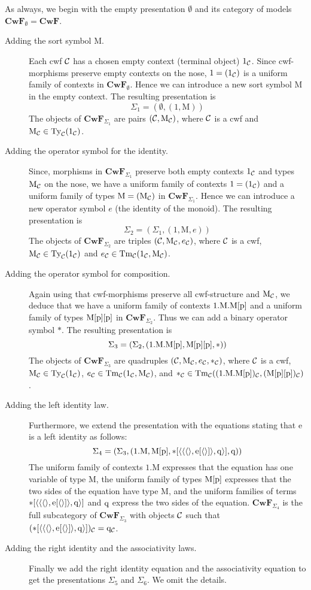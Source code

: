 \documentclass{mscs}
\newcommand{\FYI}[1]{{#1}}
\def\Cwf{\mathbf{CwF}}
\def\Mon{\mathrm{M}}
\def\idmon{\mathrm{e}}
\def\comp{\mathrm{*}}
\begin{document}
As always, we begin with the empty \FYI{presentation} $\emptyset$ and its category of models $\Cwf_\emptyset = \Cwf$.
\begin{description}
\item[Adding the sort symbol $\Mon$.] Each cwf ${\mathcal C}$ has a chosen empty context (terminal object) $1_{\mathcal C}$. Since cwf-morphisms preserve empty contexts on the nose, $1 = (1_{\mathcal C})$ is a uniform family of contexts in $\Cwf_\emptyset$. Hence we can introduce a new sort symbol $\Mon$ in the empty context. The resulting \FYI{presentation} is
$$
\Sigma_1 = (\emptyset, (1,\Mon))
$$
The objects of $\Cwf_{\Sigma_1}$  are pairs $(\C,\Mon_\C)$, where ${\mathcal C}$ is a cwf and $\Mon_\C \in \Ty_\C(1_\C)$.
\item[Adding the operator symbol for the identity.]
Since, morphisms in $\Cwf_{\Sigma_1}$ preserve both empty contexts $1_{\mathcal C}$ and types $\Mon_\C$ on the nose, we have a uniform family of contexts $1 = (1_{\mathcal C})$ and a uniform family of types $\Mon = (\Mon_\C)$ in $\Cwf_{\Sigma_1}$. Hence we can introduce a new operator symbol $e$ (the identity of the monoid).  The resulting \FYI{presentation} is
$$
\Sigma_2 = (\Sigma_1, (1,\Mon,e))
$$
The objects of $\Cwf_{\Sigma_2}$  are triples $(\C,\Mon_\C,e_\C)$, where ${\mathcal C}$ is a cwf, $\Mon_\C \in \Ty_\C(1_\C)$ and $e_\C \in \Tm_\C(1_\C,\Mon_\C)$.
\item[Adding the operator symbol for composition.]
Again using that cwf-morphisms preserve all cwf-structure and $\Mon_\C$, we deduce that we have a uniform family of contexts $1.\Mon.\Mon[\p]$ and a uniform family of types $\Mon[\p][\p]$ in $\Cwf_{\Sigma_2}$. Thus we can add a binary operator symbol $\comp$. The resulting \FYI{presentation} is
$$
\Sigma_3 = (\Sigma_2, (1.\Mon.\Mon[\p],\Mon[\p][\p],\comp))
$$
The objects of $\Cwf_{\Sigma_3}$  are quadruples $(\C,\Mon_\C,e_\C,*_\C)$, where ${\mathcal C}$ is a cwf, $\Mon_\C \in \Ty_\C(1_\C)$, $e_\C \in \Tm_\C(1_\C,\Mon_\C)$, and $*_\C \in \Tm_\C((1.\Mon.\Mon[\p])_\C,(\Mon[\p][\p])_\C)$.
\item[Adding the left identity law.]
Furthermore, we extend the \FYI{presentation} with the equations stating that $\idmon$ is a left identity as follows:
$$
\Sigma_4 = (\Sigma_3, (1.\Mon, \Mon[\p], \comp[\tuple{\tuple{\tuple{},\idmon[\tuple{}]},\q}], \q))
$$
The uniform family of contexts $1.\Mon$ expresses that the equation has one variable of type $\Mon$, the uniform family of types $\Mon[\p]$ expresses that the two sides of the equation have type $\Mon$, and the uniform families of terms $\comp[\tuple{\tuple{\tuple{},\idmon[\tuple{}]},\q}]$ and $\mathrm{q}$ express the two sides of the equation.
$\Cwf_{\Sigma_4}$ is the full subcategory of $\Cwf_{\Sigma_3}$ with objects ${\mathcal C}$
such that $(\comp[\tuple{\tuple{\tuple{},\idmon[\tuple{}]},\q}])_\C = \q_\C$.
\item[Adding the right identity and the associativity laws.]
Finally we add the right identity equation and the associativity equation to get the \FYI{presentations} $\Sigma_5$ and $\Sigma_6$. We omit the details.
\end{description}
\end{document}
